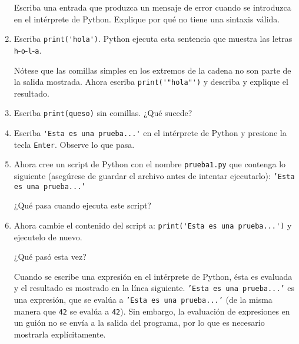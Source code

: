 \begin{enumerate}
	Escriba una entrada que produzca un mensaje de error cuando se 
	introduzca en el intérprete de Python. Explique por qué no tiene una 
	sintaxis válida.

	\item Escriba \verb+print('hola')+. Python ejecuta esta sentencia que 
	muestra las letras \texttt{h}-\texttt{o}-\texttt{l}-\texttt{a}. 
	
	Nótese que las comillas simples en los extremos de la cadena no son parte 
	de la salida mostrada. Ahora escriba \verb+print('"hola"')+ y describa y
	explique el resultado.
	
	\item Escriba \verb+print(queso)+ sin comillas. ¿Qué sucede?
	
	
	\item Escriba \verb+'Esta es una prueba...'+ en el intérprete de Python y 
	presione la tecla \texttt{Enter}. 
	Observe lo que pasa. 
	
	\item Ahora cree un script de Python con el nombre \texttt{prueba1.py} que
	contenga lo siguiente {\small (asegúrese de guardar el archivo antes de 
	intentar ejecutarlo)}:
	\texttt{'Esta es una prueba...'}
	
	¿Qué pasa cuando ejecuta este script? 
	
	\item Ahora cambie el contenido del script a: 
	\verb+print('Esta es una prueba...')+ y ejecutelo de nuevo.
	
	¿Qué pasó esta vez?
	
	Cuando se escribe una expresión en el intérprete de Python, ésta es 
	evaluada y el resultado es mostrado en la línea siguiente. 
	\texttt{'Esta es una prueba...'} es una expresión, que se 
	evalúa a \texttt{'Esta es una prueba...'} (de la misma manera que
	\texttt{42} se evalúa a \texttt{42}). Sin embargo, la evaluación de
	expresiones en un guión no se envía a la salida del programa, por lo que 
	es necesario mostrarla explícitamente.
\end{enumerate}

